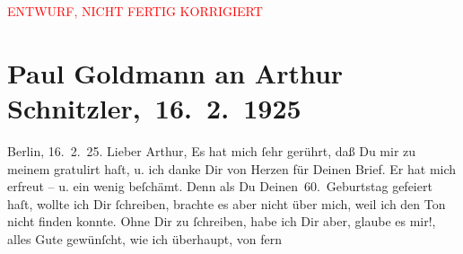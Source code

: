 
\begin{center}
            \textcolor{red}{ENTWURF, NICHT FERTIG KORRIGIERT}
                      \end{center}
            
         
         \renewcommand{\erwaehntePersonen}{Personen: Paul Goldmann}
         \renewcommand{\erwaehnteInstitutionen}{Institutionen: S. Fischer Verlag}
         \renewcommand{\erwaehnteOrte}{Orte: Berlin, Wien}
         \renewcommand{\erwaehnteWerke}{Werke: Berliner Theater. (»Der Schleier der Beatrice« von Arthur Schnitzler.), Der Schleier der Beatrice. Schauspiel in fünf Akten, Komödie der Worte. Drei Einakter, Lebendige Stunden. Vier Einakter, Neue Freie Presse, Stunde des Erkennens, Tagebuch}
               \section[ Paul Goldmann an Arthur Schnitzler, 16. 2. 1925]{ Paul Goldmann an Arthur Schnitzler, 16. 2. 1925}\nopagebreak{}\rehead{ }\begin{ledgroupsized}[t]{13cm}\normalsize\beginnumbering{} \toendnotes[C]{\smallbreak\pagebreak[2]} 
\toendnotes[C]{\smallbreak}\pstart
           {\pb}Berlin, 16. 2. 25.\pend
           \pstart{}Lieber Arthur,\pend\pstart
           Es hat mich ſehr gerührt, daß Du mir zu meinem \label{K_L03478-1v}\label{K_L03478-1h} gratulirt haſt, u. ich danke Dir von Herzen für Deinen Brief. Er hat mich
               erfreut – u. ein wenig beſchämt. Denn als Du \label{K_L03478-2v}\label{K_L03478-2h} Deinen 60. Geburtstag gefeiert haſt, wollte ich Dir ſchreiben, brachte es
               aber nicht über mich, weil ich den Ton nicht finden konnte. Ohne Dir zu ſchreiben,
               habe ich Dir aber, glaube es mir!, alles Gute gewünſcht, wie ich überhaupt, von fern

\end{ledgroupsized}
